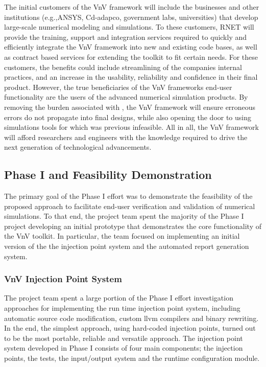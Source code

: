 The initial customers of the VnV framework will include the businesses and other institutions (e.g.,ANSYS, Cd-adapco, government labs, universities) that develop large-scale numerical modeling and simulations. To these customers, RNET will provide the training, support and integration services required to quickly and efficiently integrate the VnV framework into new and existing code bases, as well as contract based services for extending the toolkit to fit certain needs. For these customers, the benefits could include streamlining of the companies internal \VV practices, and an increase in the usability, reliability and confidence in their final product. However, the true beneficiaries of the VnV frameworks end-user \VV functionality are the users of the advanced numerical simulation products. By removing the burden associated with \VV, the VnV framework will ensure erroneous errors do not propagate into final designs, while also opening the door to using simulations tools for which \VV was previous infeasible. All in all, the VnV framework will afford researchers and engineers with the knowledge required to drive the next generation of technological advancements. 

\subsection{Phase I and Feasibility Demonstration}

The primary goal of the Phase I effort was to demonstrate the feasibility of the proposed approach to facilitate end-user 
verification and validation of numerical simulations. To that end, the project team spent the majority of the Phase I
project developing an initial prototype that demonstrates the core functionality of the VnV toolkit. In particular, the team focused on implementing an initial version of the the injection point system and the automated report generation system. 
\subsubsection{VnV Injection Point System}

The project team spent a large portion of the Phase I effort investigation approaches for implementing the run time injection point system, including 
automatic source code modification, custom llvm compilers and binary rewriting. In the end, the simplest approach,
using hard-coded injection points, turned out to be the most portable, reliable and versatile approach. The injection point system developed in Phase I consists of four main components; the injection points, the tests, the input/output system and the runtime configuration module. 

